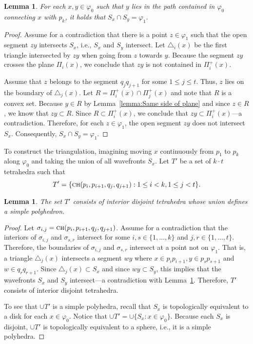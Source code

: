 \documentclass[a4paper, 11pt]{article}
\newtheorem{lemma}[theorem]{Lemma}
\newcommand{\ch}[1]{\ensuremath{\textsc{ch}(#1)}}
\begin{document}
\begin{lemma}\label{lemma:Disjoint wavefronts}
For each $x, y\in \varphi_0$ such that $y$ lies in the path contained in $\varphi_0$ connecting $x$ with $p_k$,
it holds that $S_x\cap S_y = \varphi_1$.
\end{lemma}
\begin{proof}
Assume for a contradiction that there is a point $z\in \varphi_1$ such that the open segment $zy$ intersects $S_x$, i.e., $S_x$ and $S_y$ intersect.
Let $\triangle_i(x)$ be the first triangle intersected by $zy$ when going from $z$ towards $y$.
Because the segment $zy$ crosses the plane $\Pi_i(x)$, we conclude that $zy$ is not contained in $\Pi_i^+(x)$.

Assume that $z$ belongs to the segment $q_jq_{j+1}$ for some $1\leq j\leq t$. 
Thus, $z$ lies on the boundary of $\triangle_j(x)$. 
Let $R= \Pi^+_i(x)\cap \Pi^+_j(x)$  and note that $R$ is a convex set.
Because $y\in R$ by Lemma~\ref{lemma:Same side of plane} and since $z\in R$, we know that $zy\subset R$.
Since $R\subset \Pi_i^+(x)$, we conclude that $zy\subset \Pi_i^+(x)$---a contradiction. 
Therefore, for each $z\in \varphi_1$, the open segment $zy$ does not intersect $S_x$. 
Consequently, $S_x\cap S_y = \varphi_1$.
\end{proof}

To construct the triangulation, imagining moving $x$ continuously from $p_1$ to $p_k$ along $\varphi_0$ and taking the union of all wavefronts $S_x$. 
Let $T'$  be a set of $k\cdot t$ tetrahedra such that $$T' = \{\ch{p_i, p_{i+1}, q_j, q_{j+1}} : 1\leq i <k, 1\leq j < t\}.$$

\begin{lemma}\label{lemma:Interior disjoint tetrahedra}
The set $T'$ consists of interior disjoint tetrahedra whose union defines a simple polyhedron.
\end{lemma} 
\begin{proof}
Let $\sigma_{i,j} = \ch{p_i, p_{i+1}, q_j, q_{j+1}}$.
Assume for a contradiction that the interiors of $\sigma_{i,j}$ and $\sigma_{s,r}$ intersect for some $i,s \in \{1, \ldots, k\}$ and $j,r\in \{1, \ldots,  t\}$.
Therefore, the boundaries of $\sigma_{i,j}$ and $\sigma_{s,r}$ intersect at a point not on $\varphi_1$.
That is, a triangle $\triangle_j(x)$ intersects a segment $w y$ where $x\in p_ip_{i+1}, y\in p_s p_{s+1}$ and $w\in q_{r}q_{r+1}$.
Since $\triangle_j(x)\subset S_x$ and since $wy\subset S_y$,
this implies that the wavefronts $S_x$ and $S_y$ intersect---a contradiction with Lemma~\ref{lemma:Disjoint wavefronts}.
Therefore, $T'$ consists of interior disjoint tetrahedra.

To see that $\cup T'$ is a simple polyhedra, recall that $S_x$ is topologically equivalent to a disk for each $x\in \varphi_0$.
Notice that $\cup T' = \cup\{S_x : x\in \varphi_0\}$. Because each $S_x$ is disjoint, $\cup T'$ is topologically equivalent to a sphere, i.e., it is a simple polyhedra.
\end{proof}
\end{document}
